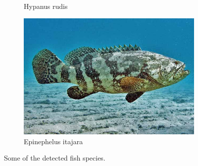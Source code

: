 \documentclass[10pt]{article}
\begin{document}
\begin{figure}
\begin{subfigure}[b]{0.45\textwidth}
         \caption{Hypanus rudis}
     \end{subfigure}
     \hfill
     \begin{subfigure}[b]{0.45\textwidth}
         \centering
         \includegraphics[width=\textwidth]{images/epinephelus_itajara.jpg}
         \caption{Epinephelus itajara}
     \end{subfigure}
     \caption{Some of the detected fish species.}
\end{figure}
\end{document}
